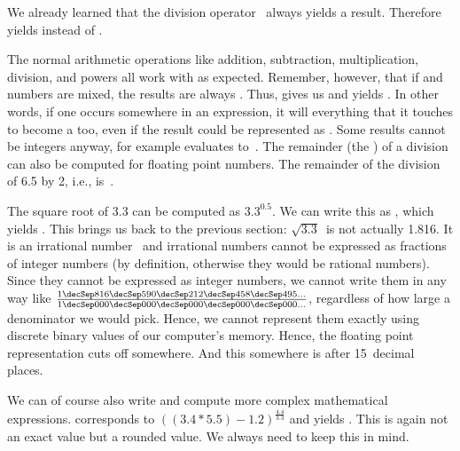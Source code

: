 We already learned that the division operator~\pythonilIdx{/} always yields a  result.
Therefore  yields  instead of .

The normal arithmetic operations like addition, subtraction, multiplication, division, and powers all work with  as expected.
Remember, however, that if  and  numbers are mixed, the results are always .
Thus, \pythonIdx{+} gives us  and \pythonIdx{*} yields .
In other words, if one  occurs somewhere in an expression, it will  everything that it touches to become a  too, even if the result could be represented as .
Some results cannot be integers anyway, for example \pythonIdx{-} evaluates to~.
The remainder (the ) of a division can also be computed for floating point numbers.
The remainder of the division of 6.5 by 2, i.e., \expandafter{}\pythonIdx{\%} is~.%
%
\begin{sloppypar}%
The square root of 3.3 can be computed as $3.3^{0.5}$.
We can write this as \pythonIdx{**}, which yields .
This brings us back to the previous section:
$\sqrt{3.3}$~is not actually 1.816.
It is an irrational number~\cite{S1988WPCHD,B1991IWNT} and irrational numbers cannot be expressed as fractions of integer numbers (by definition, otherwise they would be rational numbers).
Since they cannot be expressed as integer numbers, we cannot write them in any way like $\frac{1\decSep816\decSep590\decSep212\decSep458\decSep495\dots}{1\decSep000\decSep000\decSep000\decSep000\decSep000\dots}$, regardless of how large a denominator we would pick.
Hence, we cannot represent them exactly using discrete binary values of our computer's memory.
Hence, the floating point representation cuts off somewhere.
And this somewhere is after 15~decimal places.%
\end{sloppypar}%
%
\begin{sloppypar}%
We can of course also write and compute more complex mathematical expressions.
\pythonIdx{(}\pythonIdx{)} corresponds to $((3.4*5.5)-1.2)^{\frac{4.4}{3.3}}$ and yields .
This is again not an exact value but a rounded value.
We always need to keep this in mind.%
\end{sloppypar}%
